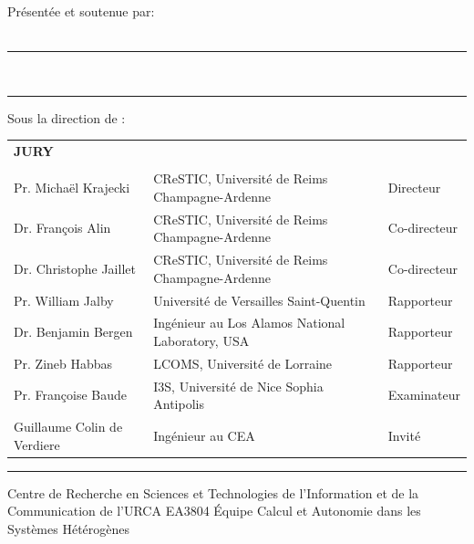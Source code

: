 \documentclass[12pt,a4paper]{report}
\begin{document}
{%
{
	\vspace{1cm}
	Pr\'esent\'ee et soutenue par:\\
	\vspace{.4cm}
	\Large
	\textbf{\phdAuthor}\\
	\vspace{.4cm}
	\large
	\vspace{.5cm}	
}

{
	\hrule height 2pt
	\vspace{2pt}
	\huge 
	\vspace{1cm}
	\phdTitleFR\\
	\large
	\vspace{1.0cm}
	\hrule
	\vspace{1cm}
}

{
	Sous la direction de :\\ 
	\textbf{\phdDirector}
	\vspace{0.5cm}
	\vspace{\fill}
}

{
\normalsize
\begin{tabular}{l l l}
		\textbf{JURY} &  & \\
		&&\\
		Pr. Michaël Krajecki & CReSTIC, Université de Reims Champagne-Ardenne & Directeur \\
		Dr. François Alin & CReSTIC, Université de Reims Champagne-Ardenne & Co-directeur  \\
		Dr. Christophe Jaillet & CReSTIC, Université de Reims Champagne-Ardenne & Co-directeur \\
		Pr. William Jalby & Université de Versailles Saint-Quentin & Rapporteur\\
		Dr. Benjamin Bergen & Ingénieur au Los Alamos National Laboratory, USA & Rapporteur \\
		Pr. Zineb Habbas & LCOMS, Université de Lorraine & Rapporteur \\ 
		Pr. Françoise Baude & I3S, Université de Nice Sophia Antipolis& Examinateur\\
		Guillaume Colin de Verdiere & Ingénieur au CEA & Invit\'e
\end{tabular}
\vspace{0.5cm}
\hrule
\vspace{0.3cm}
}

{
	Centre de Recherche en Sciences et Technologies de l'Information et de la Communication de l'URCA EA3804
}
{
	\'Equipe Calcul et Autonomie dans les Systèmes Hétérogènes
}

}
\end{document}
